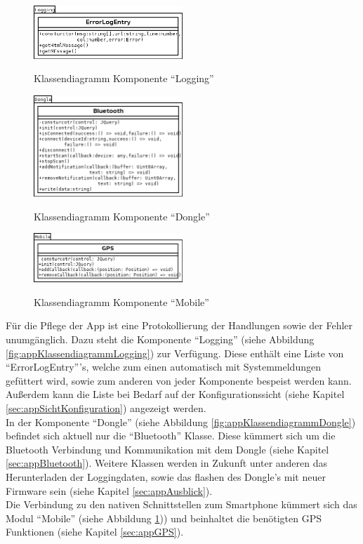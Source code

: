 \begin{figure}
  \begin{center}
    \includegraphics[width=0.5\textwidth]{./img/App_Klassendiagramm_Logging}
    \caption{Klassendiagramm Komponente \enquote{Logging}}
    \label{fig:appKlassendiagrammLogging}
    \includegraphics[width=0.5\textwidth]{./img/App_Klassendiagramm_Dongle}
    \caption{Klassendiagramm Komponente \enquote{Dongle}}
    \label{fig:appKlassendiagrammDongle}
    \includegraphics[width=0.5\textwidth]{./img/App_Klassendiagramm_Mobile}
    \caption{Klassendiagramm Komponente \enquote{Mobile}}
    \label{fig:appKlassendiagrammMobile}
  \end{center}
\end{figure}\leavevmode

Für die Pflege der App ist eine Protokollierung der Handlungen sowie der Fehler unumgänglich. Dazu steht die Komponente \enquote{Logging} (siehe Abbildung \ref{fig:appKlassendiagrammLogging}) zur Verfügung. Diese enthält eine Liste von \enquote{ErrorLogEntry}'s, welche zum einen automatisch mit Systemmeldungen gefüttert wird, sowie zum anderen von jeder Komponente bespeist werden kann. Außerdem kann die Liste bei Bedarf auf der Konfigurationssicht (siehe Kapitel \ref{sec:appSichtKonfiguration}) angezeigt werden.
\\
In der Komponente \enquote{Dongle} (siehe Abbildung \ref{fig:appKlassendiagrammDongle}) befindet sich aktuell nur die \enquote{Bluetooth} Klasse. Diese kümmert sich um die Bluetooth Verbindung und Kommunikation mit dem Dongle (siehe Kapitel \ref{sec:appBluetooth}).
Weitere Klassen werden in Zukunft unter anderen das Herunterladen der Loggingdaten, sowie das flashen des Dongle's mit neuer Firmware sein (siehe Kapitel \ref{sec:appAusblick}).
\\
Die Verbindung zu den nativen Schnittstellen zum Smartphone kümmert sich das Modul \enquote{Mobile} (siehe Abbildung \ref{fig:appKlassendiagrammMobile})) und beinhaltet die benötigten GPS Funktionen (siehe Kapitel \ref{sec:appGPS}).

